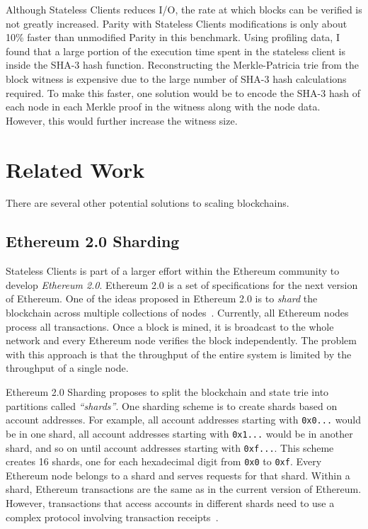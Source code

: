 \documentclass[12pt]{article}
\newcounter{protocol}
\newcommand{\System}{Stateless Clients\xspace}
\begin{document}
Although \System reduces I/O, the rate at which blocks can be verified is not greatly increased. Parity with \System modifications is only about 10\% faster than unmodified Parity in this benchmark. Using profiling data, I found that a large portion of the execution time spent in the stateless client is inside the SHA-3 hash function. Reconstructing the Merkle-Patricia trie from the block witness is expensive due to the large number of SHA-3 hash calculations required. To make this faster, one solution would be to encode the SHA-3 hash of each node in each Merkle proof in the witness along with the node data. However, this would further increase the witness size.


\section{Related Work}

There are several other potential solutions to scaling blockchains.

\subsection{Ethereum 2.0 Sharding} \label{subsection:ethereumsharding}


\System is part of a larger effort within the Ethereum community to develop \emph{Ethereum 2.0}. Ethereum 2.0 is a set of specifications for the next version of Ethereum. One of the ideas proposed in Ethereum 2.0 is to \emph{shard} the blockchain across multiple collections of nodes~\cite{ethereum-sharding}. Currently, all Ethereum nodes process all transactions. Once a block is mined, it is broadcast to the whole network and every Ethereum node verifies the block independently. The problem with this approach is that the throughput of the entire system is limited by the throughput of a single node.

Ethereum 2.0 Sharding proposes to split the blockchain and state trie into partitions called \emph{``shards''}. One sharding scheme is to create shards based on account addresses. For example, all account addresses starting with \texttt{0x0...} would be in one shard, all account addresses starting with \texttt{0x1...} would be in another shard, and so on until account addresses starting with \texttt{0xf...}. This scheme creates 16 shards, one for each hexadecimal digit from \texttt{0x0} to \texttt{0xf}. Every Ethereum node belongs to a shard and serves requests for that shard. Within a shard, Ethereum transactions are the same as in the current version of Ethereum. However, transactions that access accounts in different shards need to use a complex protocol involving transaction receipts~\cite{ethereum-cross-shard}.
\end{document}
